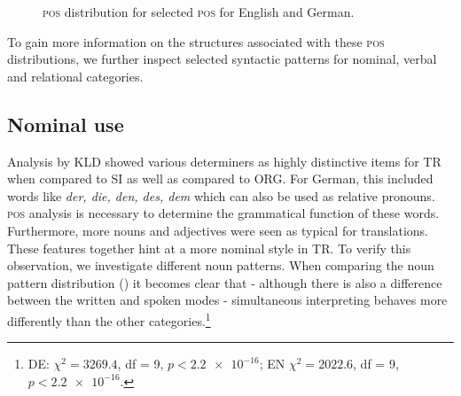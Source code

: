 \documentclass[output=paper,colorlinks,citecolor=brown]{langscibook}
\begin{document}
\begin{figure}
{{
}
}
	
\caption{\textsc{pos} distribution for selected \textsc{pos} for English and German.}
\label{fig:pos-distribution}
\end{figure}


To gain more information on the structures associated with these \textsc{pos} distributions, we further inspect selected syntactic patterns for nominal, verbal and relational categories. 

\subsection{Nominal use}

Analysis by KLD showed various determiners as highly distinctive items for TR when compared to SI as well as compared to ORG. For German, this included words like \textit{der, die, den, des, dem} which can also be used as relative pronouns.  \textsc{pos} analysis is necessary to determine the grammatical function of these words. Furthermore, more nouns and adjectives were seen as typical for translations. These features together hint at a more nominal style in TR. To verify this observation, we investigate different noun patterns. When comparing the noun pattern distribution () it becomes clear that - although there is also a difference between the written and spoken modes - simultaneous interpreting behaves more differently than the other categories.\footnote{DE: $\chi^2 = 3269.4$, df = 9, $p < \num{2.2e-16}$; EN $\chi^2 =  2022.6$, df = 9, $p < \num{2.2e-16}$.} 
\end{document}
